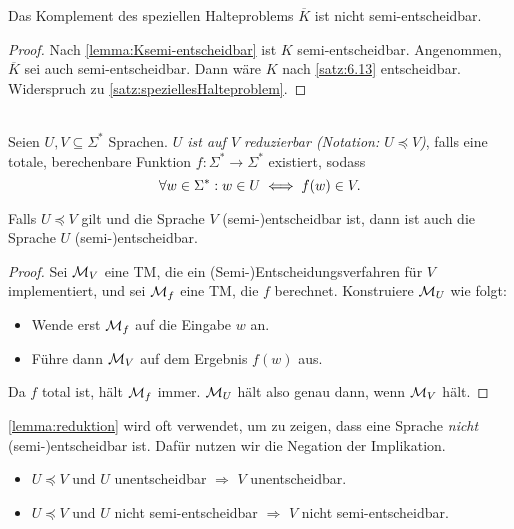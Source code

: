 \begin{Korollar}\label{kor:6.11}
    Das Komplement des speziellen Halteproblems $\overline{K}$
    ist nicht semi-{\linebreak}entscheidbar.
\end{Korollar}
\begin{proof}
Nach \autoref{lemma:Ksemi-entscheidbar} ist $K$ semi-entscheidbar. 
Angenommen, $\overline{K}$ sei auch semi-entscheidbar.
Dann wäre $K$ nach \autoref{satz:6.13} entscheidbar.
Widerspruch zu \autoref{satz:speziellesHalteproblem}.
\end{proof}


\begin{Def}[Reduktion]\ \\
  Seien $U, V \subseteq \Sigma^*$ Sprachen.
  \emph{$U$ ist auf $V$ reduzierbar (Notation: $U \preceq V$)}, falls eine totale, berechenbare Funktion
  $f:\Sigma^* \to \Sigma^*$ existiert, sodass
  \[
    \forall w \in \Sigma^*:w \in U \iff f(w) \in V. \qedhere
  \]

\end{Def}
\begin{lemma}\label{lemma:reduktion}
  Falls $U \preceq V$ gilt und die Sprache $V$ \mbox{(semi-)entscheidbar} ist, dann ist auch die Sprache $U$
  \mbox{(semi-)entscheidbar}.
\end{lemma}
\begin{proof}
  Sei $\mathcal{M}_V$ eine \ac{TM}, die ein (Semi-)Entscheidungsverfahren für $V$ implementiert,
  und sei $\mathcal{M}_f$ eine \ac{TM}, die $f$ berechnet.
  Konstruiere $\mathcal{M}_U$ wie folgt:
  \begin{itemize}
  \item Wende erst $\mathcal{M}_f$ auf die Eingabe $w$ an.
  \item Führe dann $\mathcal{M}_V$ auf dem Ergebnis $f(w)$ aus.
  \end{itemize}
  Da $f$ total ist, hält $\mathcal{M}_f$ immer.
  $\mathcal{M}_U$ hält also genau dann, wenn $\mathcal{M}_V$ hält.
\end{proof}

\begin{Bemerkung} \autoref{lemma:reduktion} wird oft verwendet, um zu zeigen, dass eine Sprache \emph{nicht} \mbox{(semi-)entscheidbar} ist.
Dafür nutzen wir die Negation der Implikation.
\begin{itemize}
 \item $U \preceq V$ und $U$ unentscheidbar $\Rightarrow$ $V$ unentscheidbar.
 \item $U \preceq V$ und $U$ nicht semi-entscheidbar $\Rightarrow$ $V$ nicht semi-entscheidbar.
 \qedhere
\end{itemize}
\end{Bemerkung}

